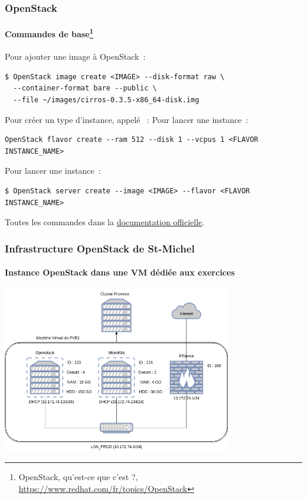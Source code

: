 \documentclass{beamer}
\begin{document}
    \begin{frame}[fragile]
        \transdissolve
        \frametitle{OpenStack}
        \framesubtitle{Commandes de base\footnote{\label{opentackcommand}OpenStack, qu'est-ce que c'est ?, \url{https://www.redhat.com/fr/topics/OpenStack}}}
        Pour ajouter une image à OpenStack~:
        \begin{lstlisting}
$ OpenStack image create <IMAGE> --disk-format raw \
  --container-format bare --public \
  --file ~/images/cirros-0.3.5-x86_64-disk.img
        \end{lstlisting}
        Pour créer un type d'instance, appelé ~:
        Pour lancer une instance~:
        \begin{lstlisting}
OpenStack flavor create --ram 512 --disk 1 --vcpus 1 <FLAVOR INSTANCE_NAME>
        \end{lstlisting}
        Pour lancer une instance~:
        \begin{lstlisting}
$ OpenStack server create --image <IMAGE> --flavor <FLAVOR INSTANCE_NAME>
        \end{lstlisting}
        \bigbreak
        Toutes les commandes dans la \href{https://docs.OpenStack.org/ocata/user-guide/cli-cheat-sheet.html}{documentation officielle}.
    \end{frame}
    \begin{frame}
        \transdissolve
        \frametitle{Infrastructure OpenStack de St-Michel}
        \framesubtitle{Instance OpenStack dans une VM dédiée aux exercices}
        \bigbreak
        \centering
        \includegraphics[width=10cm]{image/infra.drawio}
    \end{frame}
\end{document}
